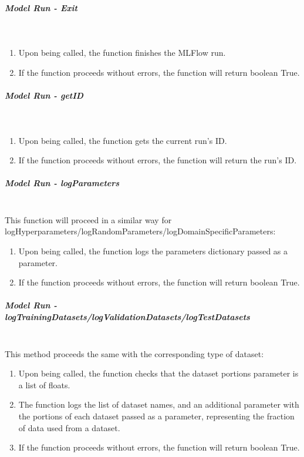 \subparagraph{Model Run - Exit} \mbox{}\\
\begin{enumerate}
    \item Upon being called, the function finishes the MLFlow run.
    \item If the function proceeds without errors, the function will return boolean True.
\end{enumerate}

\subparagraph{Model Run - getID} \mbox{}\\
\begin{enumerate}
    \item Upon being called, the function gets the current run's ID.
    \item If the function proceeds without errors, the function will return the run's ID.
\end{enumerate}

\subparagraph{Model Run - logParameters} \mbox{}\\

This function will proceed in a similar way for logHyperparameters/logRandomParameters/logDomainSpecificParameters:

\begin{enumerate}
    \item Upon being called, the function logs the parameters dictionary passed as a parameter.
    \item If the function proceeds without errors, the function will return boolean True.
\end{enumerate}

\subparagraph{Model Run - logTrainingDatasets/logValidationDatasets/logTestDatasets} \mbox{}\\

This method proceeds the same with the corresponding type of dataset:

\begin{enumerate}
    \item Upon being called, the function checks that the dataset portions parameter is a list of floats.
    \item The function logs the list of dataset names, and an additional parameter with the portions of each dataset passed as a parameter, representing 
    the fraction of data used from a dataset.
    \item If the function proceeds without errors, the function will return boolean True.
\end{enumerate}


